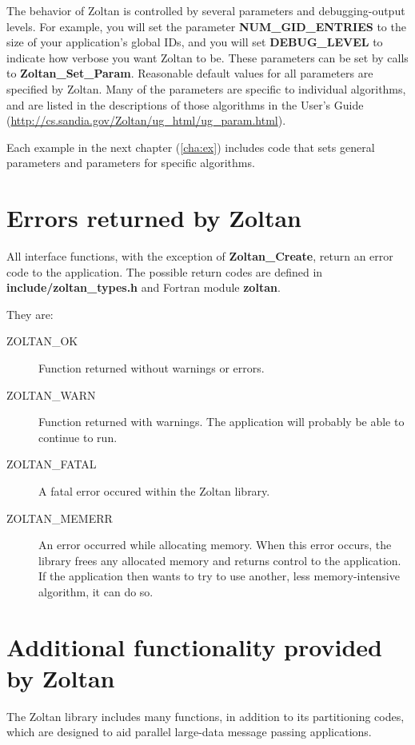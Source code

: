 The behavior of Zoltan is controlled by several parameters and debugging-output 
levels. 
For example, you will set the parameter \textbf{NUM\_GID\_ENTRIES} to the
size of your application's global IDs, and you will set \textbf{DEBUG\_LEVEL}
to indicate how verbose you want Zoltan to be.
These parameters can be set by calls to \textbf{Zoltan\_Set\_Param}. Reasonable 
default values for all parameters are specified by Zoltan. Many of the parameters 
are specific to individual algorithms, and are listed in the descriptions of those 
algorithms in the User's Guide 
(\url{http://cs.sandia.gov/Zoltan/ug\_html/ug\_param.html}).

Each example in the next chapter (\ref{cha:ex}) includes code that sets 
general parameters and parameters for specific algorithms.

\section{Errors returned by Zoltan}

All interface functions, with the exception of \textbf{Zoltan\_Create}, return an 
error code to the application. The possible return codes are defined in 
\textbf{include/zoltan\_types.h} and Fortran module \textbf{zoltan}.

They are:

\begin{description}
\item [ZOLTAN\_OK] Function returned without warnings or errors.
\item [ZOLTAN\_WARN] Function returned with warnings. The application will probably be able to continue to run.
\item [ZOLTAN\_FATAL] A fatal error occured within the Zoltan library.
\item [ZOLTAN\_MEMERR] An error occurred while allocating memory. When this error occurs, the library frees any allocated memory and returns control to the application. If the application then wants to try to use another, less memory-intensive algorithm, it can do so.
\end{description}

\section{Additional functionality provided by Zoltan}

The Zoltan library includes many functions, in addition to its
partitioning codes, which are designed to aid parallel
large-data message passing applications.

